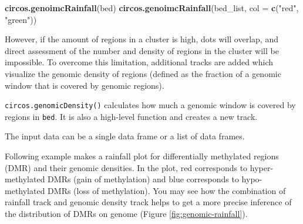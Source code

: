\documentclass[]{book}
\newenvironment{Shaded}{\begin{snugshade}}{\end{snugshade}}
\newcommand{\KeywordTok}[1]{\textcolor[rgb]{0.13,0.29,0.53}{\textbf{#1}}}
\newcommand{\DataTypeTok}[1]{\textcolor[rgb]{0.13,0.29,0.53}{#1}}
\newcommand{\DecValTok}[1]{\textcolor[rgb]{0.00,0.00,0.81}{#1}}
\newcommand{\FloatTok}[1]{\textcolor[rgb]{0.00,0.00,0.81}{#1}}
\newcommand{\StringTok}[1]{\textcolor[rgb]{0.31,0.60,0.02}{#1}}
\newcommand{\NormalTok}[1]{#1}
\theoremstyle{definition}
\theoremstyle{definition}
\theoremstyle{remark}
\begin{document}
\begin{Shaded}
\begin{Highlighting}[]
\KeywordTok{circos.genoimcRainfall}\NormalTok{(bed)}
\KeywordTok{circos.genoimcRainfall}\NormalTok{(bed_list, }\DataTypeTok{col =} \KeywordTok{c}\NormalTok{(}\StringTok{"red"}\NormalTok{, }\StringTok{"green"}\NormalTok{))}
\end{Highlighting}
\end{Shaded}

However, if the amount of regions in a cluster is high, dots will
overlap, and direct assessment of the number and density of regions in
the cluster will be impossible. To overcome this limitation, additional
tracks are added which visualize the genomic density of regions (defined
as the fraction of a genomic window that is covered by genomic regions).

\texttt{circos.genomicDensity()} calculates how much a genomic window is
covered by regions in \texttt{bed}. It is also a high-level function and
creates a new track.

The input data can be a single data frame or a list of data frames.

\begin{Shaded}
\end{Shaded}

Following example makes a rainfall plot for differentially methylated
regions (DMR) and their genomic densities. In the plot, red corresponds
to hyper-methylated DMRs (gain of methylation) and blue corresponds to
hypo-methylated DMRs (loss of methylation). You may see how the
combination of rainfall track and genomic density track helps to get a
more precise inference of the distribution of DMRs on genome (Figure
\ref{fig:genomic-rainfall}).
\end{document}
